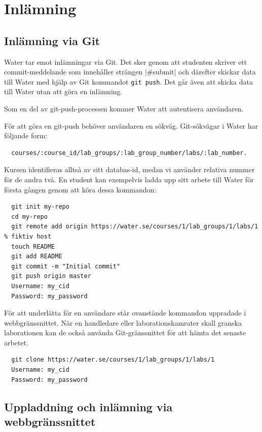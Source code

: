 \section{Inlämning}
\subsection{Inlämning via Git}

Water tar emot inlämningar via Git. Det sker genom att studenten skriver ett commit-meddelande som innehåller strängen |#submit| och därefter skickar data till Water med hjälp av Git kommandot \texttt{git push}. Det går även att skicka data till Water utan att göra en inlämning.

Som en del av git-push-processen kommer Water att autentisera användaren. 

För att göra en git-push behöver användaren en sökväg.
Git-sökvägar i Water har följande form:

\begin{verbatim}
  courses/:course_id/lab_groups/:lab_group_number/labs/:lab_number.
\end{verbatim}

Kursen identifieras alltså av sitt databas-id, medan vi använder relativa nummer för de andra två. En student kan exempelvis ladda upp sitt arbete till Water för första gången genom att köra dessa kommandon:

\begin{BVerbatim}
  git init my-repo
  cd my-repo
  git remote add origin https://water.se/courses/1/lab_groups/1/labs/1 % fiktiv host
  touch README
  git add README
  git commit -m "Initial commit"
  git push origin master
  Username: my_cid
  Password: my_password  
\end{BVerbatim}

För att underlätta för en användare står ovanstånde kommandon uppradade i webbgränssnittet. När en handledare eller laborationskamrater skall granska laborationen kan de också använda Git-gränssnittet för att hämta det senaste arbetet.

\begin{BVerbatim}
  git clone https://water.se/courses/1/lab_groups/1/labs/1
  Username: my_cid
  Password: my_password
\end{BVerbatim}
\nopagebreak

\subsection{Uppladdning och inlämning via webbgränssnittet}

